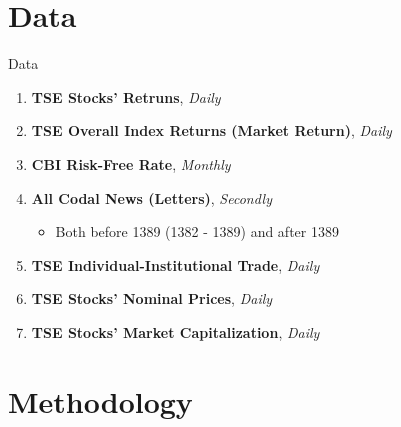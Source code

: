 \documentclass{beamer}
\begin{document}











\section{Data}



\begin{frame}{Data}

    \begin{enumerate}
        \item \textbf{TSE Stocks' Retruns}, \textit{Daily}
        \item \textbf{TSE Overall Index Returns (Market Return)}, \textit{Daily}
        \item \textbf{CBI Risk-Free Rate}, \textit{Monthly}
        \item \textbf{All Codal News (Letters)}, \textit{Secondly}
              \begin{itemize}
                  \item Both before 1389 (1382 - 1389) and after 1389
              \end{itemize}
        \item \textbf{TSE Individual-Institutional Trade}, \textit{Daily}
        \item \textbf{TSE Stocks' Nominal Prices}, \textit{Daily}
        \item \textbf{TSE Stocks' Market Capitalization}, \textit{Daily}
    \end{enumerate}

\end{frame}



\section{Methodology}


\end{document}
